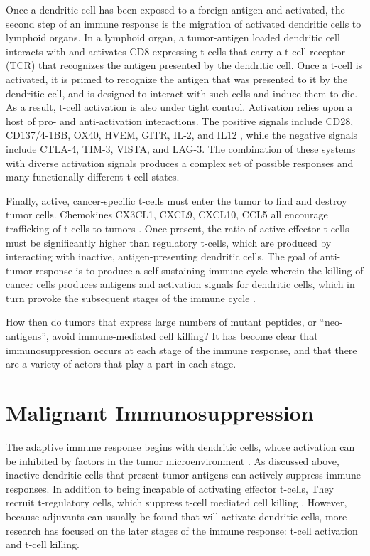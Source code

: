 Once a dendritic cell has been exposed to a foreign antigen and activated, the second step of an immune response is the migration of activated dendritic cells to lymphoid organs. 
In a lymphoid organ, a tumor-antigen loaded dendritic cell interacts with and activates CD8-expressing t-cells that carry a t-cell receptor (TCR) that recognizes the antigen presented by the dendritic cell. 
Once a t-cell is activated, it is primed to recognize the antigen that was presented to it by the dendritic cell, and is designed to interact with such cells and induce them to die. 
As a result, t-cell activation is also under tight control. 
Activation relies upon a host of pro- and anti-activation interactions. 
The positive signals include CD28, CD137/4-1BB, OX40, HVEM, GITR, IL-2, and IL12 \citep{Franciszkiewicz2012,Lippitz2013}, while the negative signals include CTLA-4, TIM-3, VISTA, and LAG-3. %
The combination of these systems with diverse activation signals produces a complex set of possible responses and many functionally different t-cell states.

Finally, active, cancer-specific t-cells must enter the tumor to find and destroy tumor cells. 
Chemokines CX3CL1, CXCL9, CXCL10, CCL5 all encourage trafficking of t-cells to tumors \citep{Franciszkiewicz2012}.
Once present, the ratio of active effector t-cells must be significantly higher than regulatory t-cells, which are produced by interacting with inactive, antigen-presenting dendritic cells.
The goal of anti-tumor response is to produce a self-sustaining immune cycle wherein the killing of cancer cells produces antigens and activation signals for dendritic cells, which in turn provoke the subsequent stages of the immune cycle \citep{Chen2013}.

How then do tumors that express large numbers of mutant peptides, or ``neo-antigens'', avoid immune-mediated cell killing? 
It has become clear that immunosuppression occurs at each stage of the immune response, and that there are a variety of actors that play a part in each stage. 

\section{Malignant Immunosuppression}

The adaptive immune response begins with dendritic cells, whose activation can be inhibited by factors in the tumor microenvironment \citep{Michielsen2012,Chevalier2017}. 
As discussed above, inactive dendritic cells that present tumor antigens can actively suppress immune responses. 
In addition to being incapable of activating effector t-cells, They recruit t-regulatory cells, which suppress t-cell mediated cell killing \citep{Ohta2006,Curiel2004}. 
However, because adjuvants can usually be found that will activate dendritic cells, more research has focused on the later stages of the immune response: t-cell activation and t-cell killing. 

